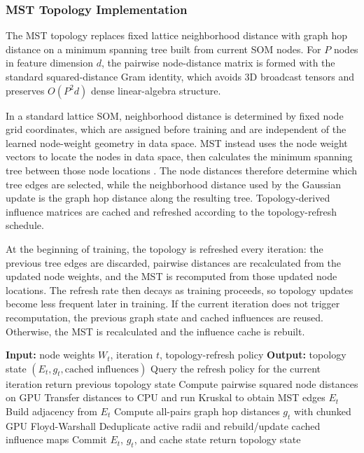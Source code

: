 \documentclass[10pt]{article} %
\begin{document}
\subsubsection{MST Topology Implementation}

The MST topology replaces fixed lattice neighborhood distance with graph hop distance on a minimum spanning tree built from current SOM nodes. For $P$ nodes in feature dimension $d$, the pairwise node-distance matrix is formed with the standard squared-distance Gram identity, which avoids 3D broadcast tensors and preserves $O(P^2 d)$ dense linear-algebra structure.

In a standard lattice SOM, neighborhood distance is determined by fixed node grid coordinates, which are assigned before training and are independent of the learned node-weight geometry in data space. MST instead uses the node weight vectors to locate the nodes in data space, then calculates the minimum spanning tree between those node locations \citep{kruskalShortestSpanningSubtree1956}. The node distances therefore determine which tree edges are selected, while the neighborhood distance used by the Gaussian update is the graph hop distance along the resulting tree. Topology-derived influence matrices are cached and refreshed according to the topology-refresh schedule.

At the beginning of training, the topology is refreshed every iteration: the previous tree edges are discarded, pairwise distances are recalculated from the updated node weights, and the MST is recomputed from those updated node locations. The refresh rate then decays as training proceeds, so topology updates become less frequent later in training. If the current iteration does not trigger recomputation, the previous graph state and cached influences are reused. Otherwise, the MST is recalculated and the influence cache is rebuilt.

\begin{algorithm}[H]
\caption{Dynamic MST topology update with refresh-triggered recomputation and cached influence reuse.}
\begin{algorithmic}[1]
\State \textbf{Input:} node weights $W_t$, iteration $t$, topology-refresh policy
\State \textbf{Output:} topology state $(E_t, g_t, \text{cached influences})$
\State Query the refresh policy for the current iteration
\State return previous topology state
\EndIf
\State Compute pairwise squared node distances on GPU
\State Transfer distances to CPU and run Kruskal to obtain MST edges $E_t$
\State Build adjacency from $E_t$
\State Compute all-pairs graph hop distances $g_t$ with chunked GPU Floyd-Warshall
\State Deduplicate active radii and rebuild/update cached influence maps
\State Commit $E_t$, $g_t$, and cache state
\State return topology state
\end{algorithmic}
\end{algorithm}
\end{document}
